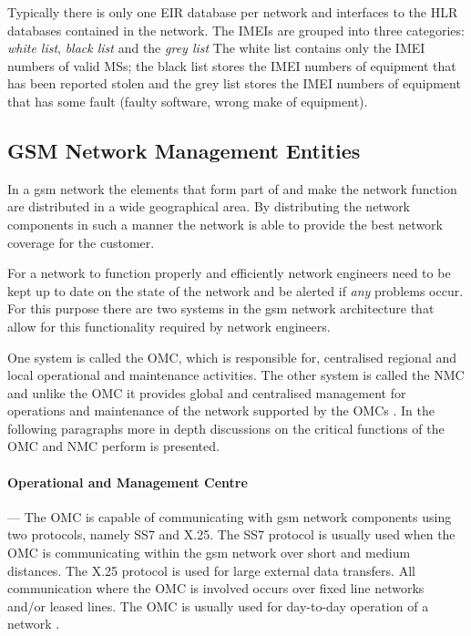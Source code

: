 Typically there is only one \gls{EIR} database per network and interfaces to the \gls{HLR} databases contained in the network\cite{GSMSysEngin}. The \glspl{IMEI} are grouped into three categories: \emph{white list}, \emph{black list} and the \emph{grey list}\cite{GSMSysEngin} The white list contains only the \gls{IMEI} numbers of valid \glspl{MS}; the black list stores the \gls{IMEI} numbers of equipment that has been reported stolen and the grey list stores the \gls{IMEI} numbers of equipment that has some fault (faulty software, wrong make of equipment)\cite{GSMSysEngin}.

\subsection{GSM Network Management Entities}
In a \gls{gsm} network the elements that form part of and make the network function are distributed in a wide geographical area. By distributing the network components in such a manner the network is able  to provide the best network coverage for the customer\cite{GSMSysEngin}. 

For a network to function properly and efficiently network engineers need to be kept up to date on the state of the network and be alerted if \emph{any} problems occur\cite{GSMSysEngin}. For this purpose there are two systems in the \gls{gsm} network architecture that allow for this functionality required by network engineers\cite{GSMSysEngin}. 

One system is called the \gls{OMC}, which is responsible for, centralised regional and local operational and maintenance activities\cite{GSMSysEngin}. The other system is called the \gls{NMC} and unlike the \gls{OMC} it provides global and centralised management for operations and maintenance of the network supported by the OMCs \cite{GSMSysEngin}.
In the following paragraphs more in depth discussions on the critical functions of the \gls{OMC} and \gls{NMC} perform is presented.

\paragraph{Operational and Management Centre}
--- The \gls{OMC} is capable of communicating with \gls{gsm} network components using two protocols, namely SS7 and X.25\cite{GSMSysEngin}. The SS7 protocol is usually used when the \gls{OMC} is communicating within the \gls{gsm} network over short and medium distances\cite{GSMSysEngin}. The X.25 protocol is used for large external data transfers\cite{GSMSysEngin}. All communication where the \gls{OMC} is involved occurs over fixed line networks and/or leased lines. The \gls{OMC} is usually used for day-to-day operation of a network \cite{GSMSysEngin}.

